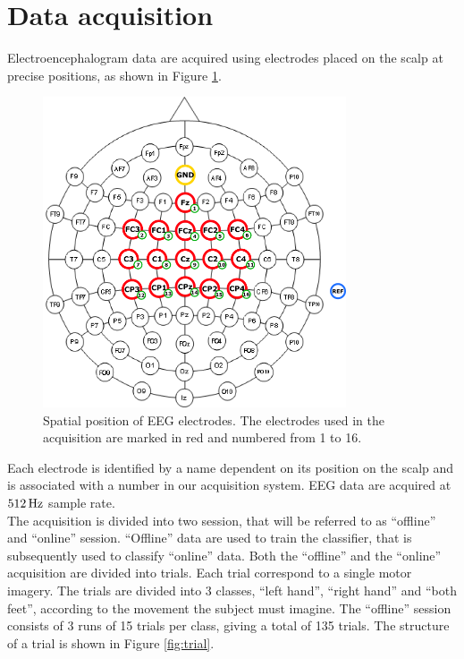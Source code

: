\section{Data acquisition}
Electroencephalogram data are acquired using electrodes placed on the scalp at precise positions, as shown in Figure \ref{fig:electrodes}.
\begin{figure}[h!]
   \centering
   \includegraphics[width=0.8\textwidth]{images/electrodes.png}
   \caption{Spatial position of EEG electrodes. The electrodes used in the acquisition are marked in red and numbered from 1 to 16.}
   \label{fig:electrodes}
\end{figure}
Each electrode is identified by a name dependent on its position on the scalp and is associated with a number in our acquisition system.
EEG data are acquired at $\unit[512]{Hz}$ sample rate. \\
The acquisition is divided into two session, that will be referred to as ``offline'' and ``online'' session.
``Offline'' data are used to train the classifier, that is subsequently used to classify ``online'' data.
Both the ``offline'' and the ``online'' acquisition are divided into trials.
Each trial correspond to a single motor imagery.
The trials are divided into 3 classes, ``left hand'', ``right hand'' and ``both feet'', according to the movement the subject must imagine.
The ``offline'' session consists of 3 runs of 15 trials per class, giving a total of 135 trials.
The structure of a trial is shown in Figure \ref{fig:trial}.
